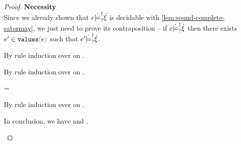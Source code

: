 \begin{proof}
  \textbf{Necessity} \\
  Since we already shown that $e \dot{\models}_{?}^{\dag} \dot{\xi}$ is decidable with
  \autoref{lem:sound-complete-satormay}, we just need to prove its
  contraposition -- if $e \dot{\models}_{?}^{\dag} \dot{\xi}$ then there exists
  $\inValues{e'}{e}$ such that $e' \dot{\models}_{?}^{\dag} \dot{\xi}$.
  \begin{pfsteps}
  \item {}  
  \end{pfsteps}
  By rule induction over  on .
  \begin{byCases}
  \item[\text{(\ref{rule:CSMSSat})}]
    \begin{pfsteps}
    \item {}  
    \end{pfsteps}
    By rule induction over  on .
    \begin{byCases}
    \item[\text{(\ref{rule:CSTruth})}]
      \begin{pfsteps}
      \item \hxi = \ctruth {}
      \end{pfsteps}
      By rule induction over  on .
      \begin{byCases}
      \item[\text{(\ref{rule:FVal})}]
        \begin{pfsteps}
        \item {} 
        \item {}  
        \end{pfsteps}
        In conclusion, we have  and .
      \item[\text{(\ref{rule:FIndet})}]
        \begin{pfsteps}
        \item {} 
        \item {}  
        \item {}  

\end{pfsteps}
\end{byCases}
\end{byCases}
\end{byCases}
\end{proof}
